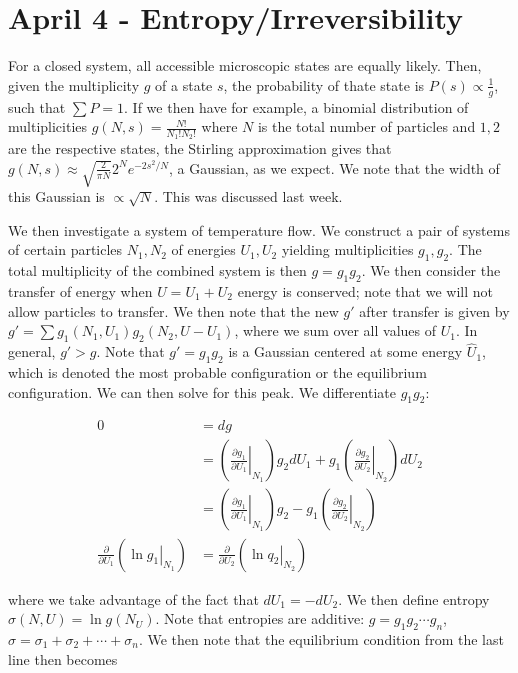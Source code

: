 \documentclass[12pt]{article}
\begin{document}
\doublespace
\pagestyle{fancy}
\setlength{\headheight}{15pt}

\section{April 4 - Entropy/Irreversibility}

For a closed system, all accessible microscopic states are equally likely. Then, given the multiplicity $g$ of a state $s$, the probability of thate state is $P(s) \propto \frac{1}{g}$, such that $\sum{P} = 1$. If we then have for example, a binomial distribution of multiplicities $g(N,s) =\frac{N!}{N_{1}!N_{2}!}$ where $N$ is the total number of particles and $1,2$ are the respective states, the Stirling approximation gives that $g(N,s) \approx \sqrt{\frac{2}{\pi N}}2^Ne^{-2s^2/N}$, a Gaussian, as we expect. We note that the width of this Gaussian is $\propto \sqrt{N}$. This was discussed last week.

We then investigate a system of temperature flow. We construct a pair of systems of certain particles $N_1, N_2$ of energies $U_1, U_2$ yielding multiplicities $g_1, g_2$. The total multiplicity of the combined system is then $g = g_1g_2$. We then consider the transfer of energy when $U = U_1 + U_2$ energy is conserved; note that we will not allow particles to transfer. We then note that the new $g'$ after transfer is given by $g' = \sum{g_1(N_1,U_1)g_2(N_2,U-U_1)}$, where we sum over all values of $U_1$. In general, $g' > g$. Note that $g' = g_1g_2$ is a Gaussian centered at some energy $\hat{U}_1$, which is denoted the most probable configuration or the equilibrium configuration. We can then solve for this peak. We differentiate $g_1g_2$:

\begin{align*}
	0 &= dg\\
	&= \left(\left.\frac{\partial g_1}{\partial U_1}\right|_{N_1}\right)g_2dU_1 + g_1\left(\left.\frac{\partial g_2}{\partial U_2}\right|_{N_2}\right)dU_2\\
	&= \left(\left.\frac{\partial g_1}{\partial U_1}\right|_{N_1}\right)g_2 - g_1\left(\left.\frac{\partial g_2}{\partial U_2}\right|_{N_2}\right)\\
	\frac{\partial}{\partial U_1}\left(\left.\ln g_1\right|_{N_1}\right) &= \frac{\partial}{\partial U_2}\left(\left.\ln q_2\right|_{N_2}\right)
\end{align*}

where we take advantage of the fact that $dU_1 = -dU_2$. We then define entropy $\sigma(N,U) = \ln g(N_U)$. Note that entropies are additive: $g = g_1g_2\cdots g_n$, $\sigma = \sigma_1 + \sigma_2 +\cdots + \sigma_n$. We then note that the equilibrium condition from the last line then becomes
\end{document}
